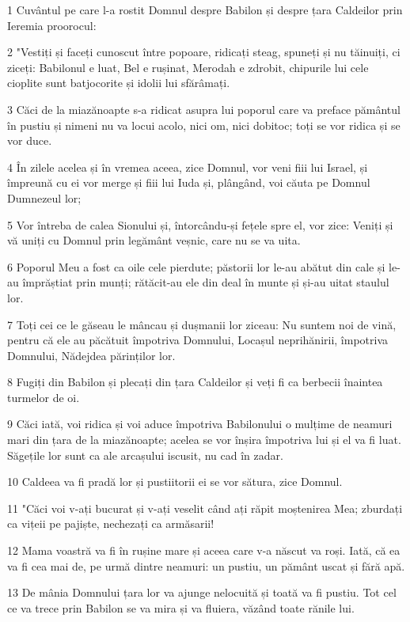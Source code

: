 \par 1 Cuvântul pe care l-a rostit Domnul despre Babilon și despre țara Caldeilor prin Ieremia proorocul:
\par 2 "Vestiți și faceți cunoscut între popoare, ridicați steag, spuneți și nu tăinuiți, ci ziceți: Babilonul e luat, Bel e rușinat, Merodah e zdrobit, chipurile lui cele cioplite sunt batjocorite și idolii lui sfărâmați.
\par 3 Căci de la miazănoapte s-a ridicat asupra lui poporul care va preface pământul în pustiu și nimeni nu va locui acolo, nici om, nici dobitoc; toți se vor ridica și se vor duce.
\par 4 În zilele acelea și în vremea aceea, zice Domnul, vor veni fiii lui Israel, și împreună cu ei vor merge și fiii lui Iuda și, plângând, voi căuta pe Domnul Dumnezeul lor;
\par 5 Vor întreba de calea Sionului și, întorcându-și fețele spre el, vor zice: Veniți și vă uniți cu Domnul prin legământ veșnic, care nu se va uita.
\par 6 Poporul Meu a fost ca oile cele pierdute; păstorii lor le-au abătut din cale și le-au împrăștiat prin munți; rătăcit-au ele din deal în munte și și-au uitat staulul lor.
\par 7 Toți cei ce le găseau le mâncau și dușmanii lor ziceau: Nu suntem noi de vină, pentru că ele au păcătuit împotriva Domnului, Locașul neprihănirii, împotriva Domnului, Nădejdea părinților lor.
\par 8 Fugiți din Babilon și plecați din țara Caldeilor și veți fi ca berbecii înaintea turmelor de oi.
\par 9 Căci iată, voi ridica și voi aduce împotriva Babilonului o mulțime de neamuri mari din țara de la miazănoapte; acelea se vor înșira împotriva lui și el va fi luat. Săgețile lor sunt ca ale arcașului iscusit, nu cad în zadar.
\par 10 Caldeea va fi pradă lor și pustiitorii ei se vor sătura, zice Domnul.
\par 11 "Căci voi v-ați bucurat și v-ați veselit când ați răpit moștenirea Mea; zburdați ca vițeii pe pajiște, nechezați ca armăsarii!
\par 12 Mama voastră va fi în rușine mare și aceea care v-a născut va roși. Iată, că ea va fi cea mai de, pe urmă dintre neamuri: un pustiu, un pământ uscat și fără apă.
\par 13 De mânia Domnului țara lor va ajunge nelocuită și toată va fi pustiu. Tot cel ce va trece prin Babilon se va mira și va fluiera, văzând toate rănile lui.
